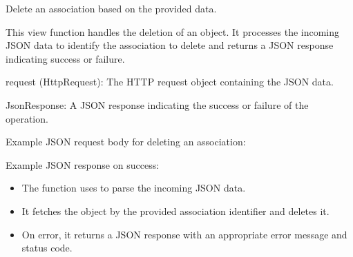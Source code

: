 \documentclass[letterpaper,10pt,english]{sphinxmanual}
\begin{document}
\begin{fulllineitems}
\label{\detokenize{app:app.views.delete_association}}
\pysigstartsignatures
{}
\pysigstopsignatures
\sphinxAtStartPar
Delete an association based on the provided data.

\sphinxAtStartPar
This view function handles the deletion of an  object. 
It processes the incoming JSON data to identify the association to delete and 
returns a JSON response indicating success or failure.
\begin{description}
\sphinxAtStartPar
request (HttpRequest): The HTTP request object containing the JSON data.

\sphinxAtStartPar
JsonResponse: A JSON response indicating the success or failure of the operation.

\sphinxAtStartPar
Example JSON request body for deleting an association:

\begin{sphinxVerbatim}[commandchars=\\\{\}]
\end{sphinxVerbatim}

\sphinxAtStartPar
Example JSON response on success:

\begin{sphinxVerbatim}[commandchars=\\\{\}]
\end{sphinxVerbatim}

\begin{itemize}
\item {} 
\sphinxAtStartPar
The function uses  to parse the incoming JSON data.

\item {} 
\sphinxAtStartPar
It fetches the  object by the provided association identifier and deletes it.

\item {} 
\sphinxAtStartPar
On error, it returns a JSON response with an appropriate error message and status code.

\end{itemize}

\end{description}

\end{fulllineitems}
\end{document}
